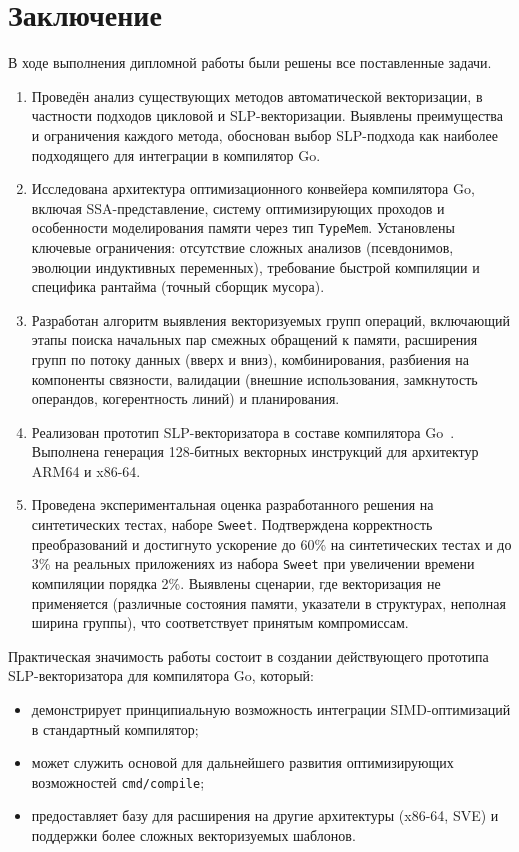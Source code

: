 \section{Заключение}

В ходе выполнения дипломной работы были решены все поставленные задачи.

\begin{enumerate}
    \item Проведён анализ существующих методов автоматической векторизации, 
    в частности подходов цикловой и SLP-векторизации. 
    Выявлены преимущества и ограничения каждого метода, обоснован выбор SLP-подхода как наиболее подходящего для интеграции в компилятор Go.
    
    \item Исследована архитектура оптимизационного конвейера компилятора Go, включая SSA-представление, 
    систему оптимизирующих проходов и особенности моделирования памяти через тип \texttt{TypeMem}. 
    Установлены ключевые ограничения: отсутствие сложных анализов (псевдонимов, эволюции индуктивных переменных), 
    требование быстрой компиляции и специфика рантайма (точный сборщик мусора).
    
    \item Разработан алгоритм выявления векторизуемых групп операций, включающий этапы поиска начальных пар смежных обращений к памяти, 
    расширения групп по потоку данных (вверх и вниз), комбинирования, 
    разбиения на компоненты связности, валидации (внешние использования, замкнутость операндов, когерентность линий) и планирования.
    
    \item Реализован прототип SLP-векторизатора в составе компилятора Go~\cite{go_cl_783220}. 
    Выполнена генерация 128-битных векторных инструкций для архитектур ARM64 и x86-64. 
    
    \item Проведена экспериментальная оценка разработанного решения на синтетических тестах, наборе \texttt{Sweet}. 
    Подтверждена корректность преобразований и достигнуто ускорение до 60\% на синтетических тестах и до 3\% на реальных приложениях из набора \texttt{Sweet} 
    при увеличении времени компиляции порядка 2\%. 
    Выявлены сценарии, где векторизация не применяется (различные состояния памяти, указатели в структурах, неполная ширина группы), 
    что соответствует принятым компромиссам.
\end{enumerate}

Практическая значимость работы состоит в создании действующего прототипа SLP-векторизатора для компилятора Go, который:
\begin{itemize}
    \item демонстрирует принципиальную возможность интеграции SIMD-оптимизаций в стандартный компилятор;
    \item может служить основой для дальнейшего развития оптимизирующих возможностей \texttt{cmd/compile};
    \item предоставляет базу для расширения на другие архитектуры (x86-64, SVE) и поддержки более сложных векторизуемых шаблонов.
\end{itemize}

